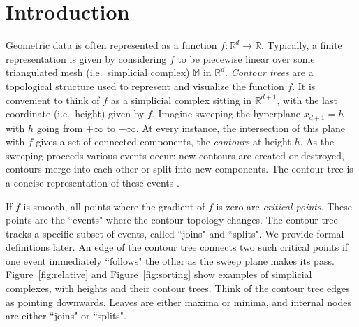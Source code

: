 \documentclass[11pt]{article}
\theoremstyle{definition}
\newcommand{\MM}{\mathbb{M}}
\newcommand{\RR}{\mathbb{R}}
\newcommand{\Fig}[1]{\hyperref[fig:#1]{Figure~\ref*{fig:#1}}} %
\begin{document}
\newpage
{}

\section{Introduction}

Geometric data is often represented as a function $f: \RR^d \to \RR$. Typically, a finite representation is given
by considering $f$ to be piecewise linear over some triangulated mesh (i.e.\ simplicial complex) $\MM$ in $\RR^d$.
\emph{Contour trees} are a topological structure used to represent and visualize
the function $f$. 
It is convenient to think of $f$ as a simplicial complex sitting in $\RR^{d+1}$,
with the last coordinate (i.e.\ height) given by $f$. Imagine sweeping the hyperplane $x_{d+1} = h$
with $h$ going from $+\infty$ to $-\infty$. At every instance, the intersection of this plane 
with $f$ gives a set of connected components, the \emph{contours} at height $h$. As the sweeping 
proceeds various events occur: new contours are created or destroyed, contours merge into each other or
split into new components. 
The contour tree is a concise representation of these events \cite{kobps-ctsssit-97,csa-cctad-03}.

If $f$ is smooth, all points where the gradient of $f$ is zero are \emph{critical points}.
These points are the ``events" where the contour topology changes. The contour tree tracks a specific
subset of events, called ``joins" and ``splits".
We provide formal definitions later.
An edge of the contour tree connects two such critical points if one event immediately ``follows"
the other as the sweep plane makes its pass.  
\Fig{relative} and \Fig{sorting} 
show examples of simplicial complexes, with heights and their contour trees.
Think of the contour tree edges as pointing downwards. Leaves are either maxima or minima,
and internal nodes are either ``joins" or ``splits".

\end{document}
